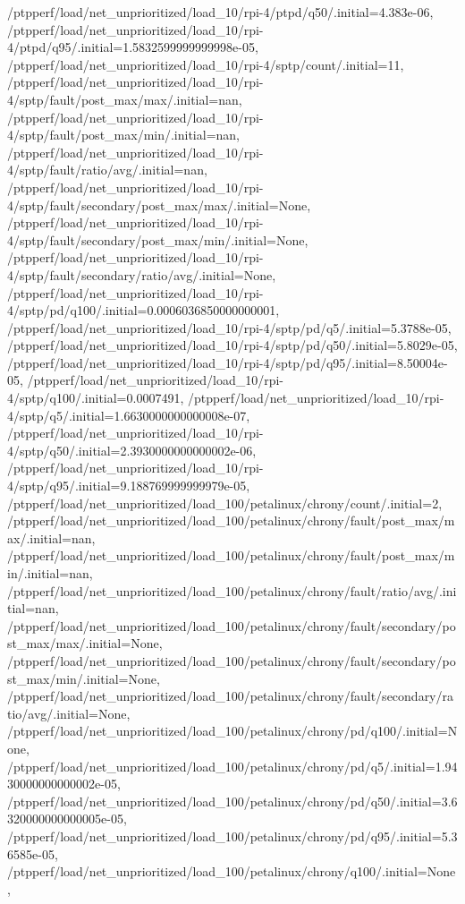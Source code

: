 {    /ptpperf/load/net_unprioritized/load_10/rpi-4/ptpd/q50/.initial=4.383e-06,
    /ptpperf/load/net_unprioritized/load_10/rpi-4/ptpd/q95/.initial=1.5832599999999998e-05,
    /ptpperf/load/net_unprioritized/load_10/rpi-4/sptp/count/.initial=11,
    /ptpperf/load/net_unprioritized/load_10/rpi-4/sptp/fault/post_max/max/.initial=nan,
    /ptpperf/load/net_unprioritized/load_10/rpi-4/sptp/fault/post_max/min/.initial=nan,
    /ptpperf/load/net_unprioritized/load_10/rpi-4/sptp/fault/ratio/avg/.initial=nan,
    /ptpperf/load/net_unprioritized/load_10/rpi-4/sptp/fault/secondary/post_max/max/.initial=None,
    /ptpperf/load/net_unprioritized/load_10/rpi-4/sptp/fault/secondary/post_max/min/.initial=None,
    /ptpperf/load/net_unprioritized/load_10/rpi-4/sptp/fault/secondary/ratio/avg/.initial=None,
    /ptpperf/load/net_unprioritized/load_10/rpi-4/sptp/pd/q100/.initial=0.0006036850000000001,
    /ptpperf/load/net_unprioritized/load_10/rpi-4/sptp/pd/q5/.initial=5.3788e-05,
    /ptpperf/load/net_unprioritized/load_10/rpi-4/sptp/pd/q50/.initial=5.8029e-05,
    /ptpperf/load/net_unprioritized/load_10/rpi-4/sptp/pd/q95/.initial=8.50004e-05,
    /ptpperf/load/net_unprioritized/load_10/rpi-4/sptp/q100/.initial=0.0007491,
    /ptpperf/load/net_unprioritized/load_10/rpi-4/sptp/q5/.initial=1.6630000000000008e-07,
    /ptpperf/load/net_unprioritized/load_10/rpi-4/sptp/q50/.initial=2.3930000000000002e-06,
    /ptpperf/load/net_unprioritized/load_10/rpi-4/sptp/q95/.initial=9.188769999999979e-05,
    /ptpperf/load/net_unprioritized/load_100/petalinux/chrony/count/.initial=2,
    /ptpperf/load/net_unprioritized/load_100/petalinux/chrony/fault/post_max/max/.initial=nan,
    /ptpperf/load/net_unprioritized/load_100/petalinux/chrony/fault/post_max/min/.initial=nan,
    /ptpperf/load/net_unprioritized/load_100/petalinux/chrony/fault/ratio/avg/.initial=nan,
    /ptpperf/load/net_unprioritized/load_100/petalinux/chrony/fault/secondary/post_max/max/.initial=None,
    /ptpperf/load/net_unprioritized/load_100/petalinux/chrony/fault/secondary/post_max/min/.initial=None,
    /ptpperf/load/net_unprioritized/load_100/petalinux/chrony/fault/secondary/ratio/avg/.initial=None,
    /ptpperf/load/net_unprioritized/load_100/petalinux/chrony/pd/q100/.initial=None,
    /ptpperf/load/net_unprioritized/load_100/petalinux/chrony/pd/q5/.initial=1.9430000000000002e-05,
    /ptpperf/load/net_unprioritized/load_100/petalinux/chrony/pd/q50/.initial=3.6320000000000005e-05,
    /ptpperf/load/net_unprioritized/load_100/petalinux/chrony/pd/q95/.initial=5.36585e-05,
    /ptpperf/load/net_unprioritized/load_100/petalinux/chrony/q100/.initial=None,
}
